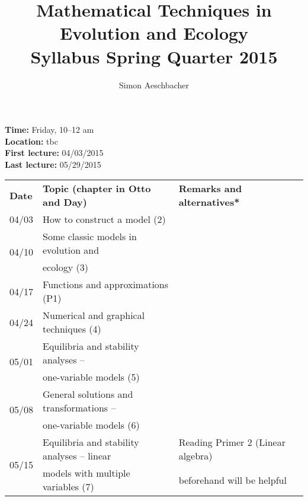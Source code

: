 \documentclass[
	letterpaper,
	12pt
]{article}
\begin{document}
\title{Mathematical Techniques in Evolution and Ecology\\Syllabus Spring Quarter 2015}
\author{Simon Aeschbacher}

\maketitle
\thispagestyle{empty}

\noindent \textbf{Time:} Friday, 10--12 am\\
\textbf{Location:} tbc\\
\textbf{First lecture:} 04/03/2015\\
\textbf{Last lecture:} 05/29/2015\\

\renewcommand{\arraystretch}{1.75}

\begin{table}[ht]
	\begin{tabular}{@{\extracolsep{\fill}}llll}
		\textbf{Date} & \textbf{Topic (chapter in Otto and Day)} & \textbf{Remarks and alternatives*} \\
		04/03 & How to construct a model (2) & \\
		
		\multirow{2}{*}{04/10} & Some classic models in evolution and& \multirow{2}{*}{}\\[-0.35cm]
		 & ecology (3) & \\
		
		04/17 & Functions and approximations (P1) &  \\
		
		04/24 & Numerical and graphical techniques (4) & \\
		
		\multirow{2}{*}{05/01} & Equilibria and stability analyses -- & \multirow{2}{*}{}\\[-0.35cm]
		 & one-variable models (5) & \\
		
		\multirow{2}{*}{05/08} & General solutions and transformations -- & \multirow{2}{*}{}\\[-0.35cm]
		 & one-variable models (6) & \\
		
		\multirow{2}{*}{05/15} & Equilibria and stability analyses -- linear & Reading Primer 2 (Linear algebra)\\[-0.35cm]
		 & models with multiple variables (7) & beforehand will be helpful\\
		

\end{tabular}
\end{table}
\end{document}
